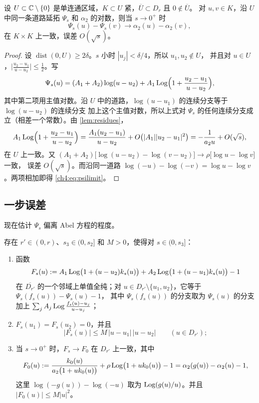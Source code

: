 \begin{lemma}[模型时间的极限]\label{ch4:lem:psi-limit}
设 $U\subset\mathbb{C}\setminus\{0\}$ 是单连通区域，$K\subset U$ 紧，$\overline U\subset D_r$ 且 $0\notin\overline U$。
对 $u,v\in K$，沿 $U$ 中同一条道路延拓 $\Psi_s$ 和 $\alpha_2$ 的对数，则当 $s\to0^+$ 时
\begin{equation}\label{ch4:eq:psilimit}
 \Psi_s(u)-\Psi_s(v)\longrightarrow\alpha_2(u)-\alpha_2(v),
\end{equation}
在 $K\times K$ 上一致，误差 $O(\sqrt s)$。
\end{lemma}

\begin{proof}
设 $\operatorname{dist}(0,U)\ge2\delta$。$s$ 小时 $|u_j|<\delta/4$，所以 $u_1,u_2\notin U$，
并且对 $u\in U$，$\bigl|\frac{u_2-u_1}{u-u_2}\bigr|\le\frac12$。写
\[
 \Psi_s(u)=(A_1+A_2)\log(u-u_2)+A_1\operatorname{Log}\Bigl(1+\frac{u_2-u_1}{u-u_2}\Bigr),
\]
其中第二项用主值对数。沿 $U$ 中的道路，$\log(u-u_1)$ 的连续分支等于 $\log(u-u_2)$ 的连续分支
加上这个主值对数，所以上式对 $\Psi_s$ 的任何连续分支成立（相差一个常数）。由 \cref{lem:residues}，
\[
 A_1\operatorname{Log}\Bigl(1+\frac{u_2-u_1}{u-u_2}\Bigr)=\frac{A_1(u_2-u_1)}{u-u_2}+O\bigl(|A_1||u_2-u_1|^2\bigr)
 =-\frac1{a_2u}+O(\sqrt s),
\]
在 $U$ 上一致。又 $(A_1+A_2)\bigl[\log(u-u_2)-\log(v-u_2)\bigr]\to\rho\bigl[\log u-\log v\bigr]$ 一致，
误差 $O(\sqrt s)$。而沿同一道路 $\log(-u)-\log(-v)=\log u-\log v$。两项相加即得 \eqref{ch4:eq:psilimit}。
\end{proof}

\subsection{一步误差}

现在估计 $\Psi_s$ 偏离 Abel 方程的程度。

\begin{lemma}[一致的一步误差]\label{ch4:lem:one-step}
存在 $r'\in(0,r)$、$s_3\in(0,s_2]$ 和 $M>0$，使得对 $s\in(0,s_3]$：
\begin{enumerate}
\item 函数
  \begin{equation}\label{ch4:eq:F}
   F_s(u):=A_1\operatorname{Log}\bigl(1+(u-u_2)k_s(u)\bigr)+A_2\operatorname{Log}\bigl(1+(u-u_1)k_s(u)\bigr)-1
  \end{equation}
  在 $\overline{D_{r'}}$ 的一个邻域上单值全纯；对 $u\in D_{r'}\setminus\{u_1,u_2\}$，它等于 $\Psi_s(f_s(u))-\Psi_s(u)-1$，
  其中 $\Psi_s(f_s(u))$ 的分支取为 $\Psi_s(u)$ 的分支加上 $\sum_jA_j\operatorname{Log}\frac{f_s(u)-u_j}{u-u_j}$；
\item $F_s(u_1)=F_s(u_2)=0$，并且
  \[
   |F_s(u)|\le M\,|u-u_1|\,|u-u_2|\qquad(u\in D_{r'});
  \]
\item 当 $s\to0^+$ 时，$F_s\to F_0$ 在 $D_{r'}$ 上一致，其中
  \[
   F_0(u):=\frac{k_0(u)}{a_2\bigl(1+uk_0(u)\bigr)}+\rho\operatorname{Log}\bigl(1+uk_0(u)\bigr)-1
   =\alpha_2(g(u))-\alpha_2(u)-1,
  \]
  这里 $\log(-g(u))-\log(-u)$ 取为 $\operatorname{Log}(g(u)/u)$。并且 $|F_0(u)|\le M|u|^2$。
\end{enumerate}
\end{lemma}

